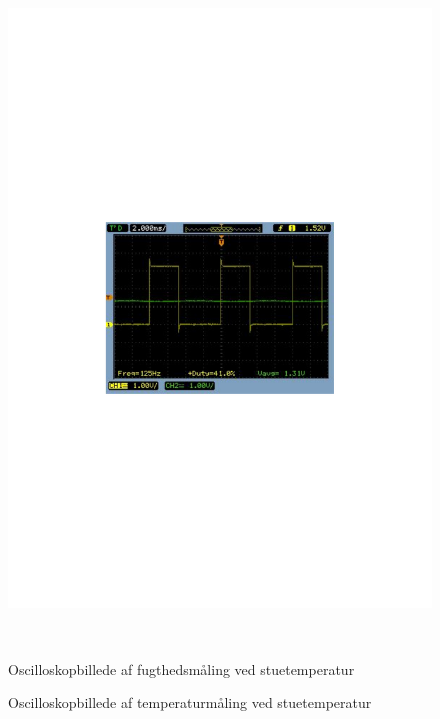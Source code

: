 \begin{figure}[H]
\begin{minipage}[b]{0.48\textwidth}
\includegraphics[width=1.00\textwidth]{filer/modultest/Billeder/SCOP_tempSTUETEMP} %
\end{minipage} \\ %
\begin{minipage}[t]{0.48\textwidth}
\caption{Oscilloskopbillede af fugthedsmåling ved stuetemperatur} %
\label{fig:SCOP_FUGT_STUE}
\end{minipage} \hfill
\begin{minipage}[t]{0.48\textwidth}
\caption{Oscilloskopbillede af temperaturmåling ved stuetemperatur} %
\label{fig:SCOP_TEMP_STUE}
\end{minipage}
\end{figure}

